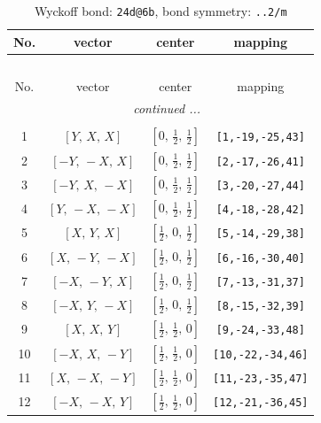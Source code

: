 \documentclass[fleqn,8pt]{jsarticle}
\begin{document}
\begin{longtable}{cccc}
\caption{Wyckoff bond: {\tt 24d@6b}, bond symmetry: {\tt ..2/m}}
 \\
 \hline \hline
No. & vector & center & mapping \\ \hline \endfirsthead

\multicolumn{3}{l}{\tablename\ \thetable{}} \\
 \hline \hline
No. & vector & center & mapping \\ \hline \endhead

 \hline \hline
\multicolumn{3}{r}{\footnotesize\it continued ...} \\ \endfoot

 \hline \hline
\multicolumn{3}{r}{} \\ \endlastfoot

1 & $\left[ Y,\, X,\, X \right]$ & $\left[ 0,\, \frac{1}{2},\, \frac{1}{2} \right]$ & {\tt [1,-19,-25,43]} \\ \hline
2 & $\left[ - Y,\, - X,\, X \right]$ & $\left[ 0,\, \frac{1}{2},\, \frac{1}{2} \right]$ & {\tt [2,-17,-26,41]} \\ \hline
3 & $\left[ - Y,\, X,\, - X \right]$ & $\left[ 0,\, \frac{1}{2},\, \frac{1}{2} \right]$ & {\tt [3,-20,-27,44]} \\ \hline
4 & $\left[ Y,\, - X,\, - X \right]$ & $\left[ 0,\, \frac{1}{2},\, \frac{1}{2} \right]$ & {\tt [4,-18,-28,42]} \\ \hline
5 & $\left[ X,\, Y,\, X \right]$ & $\left[ \frac{1}{2},\, 0,\, \frac{1}{2} \right]$ & {\tt [5,-14,-29,38]} \\ \hline
6 & $\left[ X,\, - Y,\, - X \right]$ & $\left[ \frac{1}{2},\, 0,\, \frac{1}{2} \right]$ & {\tt [6,-16,-30,40]} \\ \hline
7 & $\left[ - X,\, - Y,\, X \right]$ & $\left[ \frac{1}{2},\, 0,\, \frac{1}{2} \right]$ & {\tt [7,-13,-31,37]} \\ \hline
8 & $\left[ - X,\, Y,\, - X \right]$ & $\left[ \frac{1}{2},\, 0,\, \frac{1}{2} \right]$ & {\tt [8,-15,-32,39]} \\ \hline
9 & $\left[ X,\, X,\, Y \right]$ & $\left[ \frac{1}{2},\, \frac{1}{2},\, 0 \right]$ & {\tt [9,-24,-33,48]} \\ \hline
10 & $\left[ - X,\, X,\, - Y \right]$ & $\left[ \frac{1}{2},\, \frac{1}{2},\, 0 \right]$ & {\tt [10,-22,-34,46]} \\ \hline
11 & $\left[ X,\, - X,\, - Y \right]$ & $\left[ \frac{1}{2},\, \frac{1}{2},\, 0 \right]$ & {\tt [11,-23,-35,47]} \\ \hline
12 & $\left[ - X,\, - X,\, Y \right]$ & $\left[ \frac{1}{2},\, \frac{1}{2},\, 0 \right]$ & {\tt [12,-21,-36,45]} \\
\end{longtable}
\end{document}
